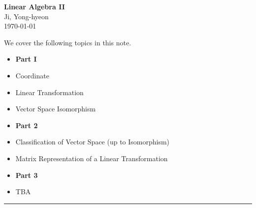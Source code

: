 \documentclass[11pt,openany]{article}
\begin{document}
\begin{center}
	\huge\textbf{Linear Algebra II}\\
	\vspace{0.5em}
	\large{Ji, Yong-hyeon}\\
	\vspace{0.5em}
	\normalsize{\today}\\
\end{center}

\noindent 
We cover the following topics in this note.
\begin{itemize}
	\item[] \textbf{Part I}
	\item Coordinate
	\item Linear Transformation
	\item Vector Space Isomorphism
	\item[] \textbf{Part 2}
	\item Classification of Vector Space (up to Isomorphism)
	\item Matrix Representation of a Linear Transformation
	\item[] \textbf{Part 3}
	\item TBA
\end{itemize}
\hrule\vspace{12pt}
\vspace{20pt}
\end{document}
